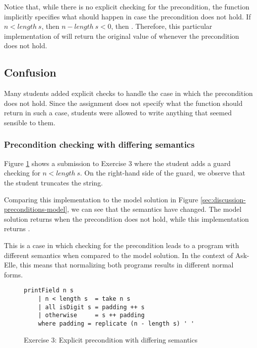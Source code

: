 Notice that, while there is no explicit checking for the precondition, the function implicitly specifies what should happen in case the precondition does not hold. If $n < length\ s$, then $n - length\ s < 0$, then . Therefore, this particular implementation of  will return the original value of  whenever the precondition does not hold.

\subsection{Confusion}

Many students added explicit checks to handle the case in which the precondition does not hold. Since the assignment does not specify what the function should return in such a case, students were allowed to write anything that seemed sensible to them.

\subsubsection{Precondition checking with differing semantics}

Figure \ref{fig:analysis-precondition-example} shows a submission to Exercise 3 where the student adds a guard checking for $n < length\ s$. On the right-hand side of the guard, we observe that the student truncates the string.

Comparing this implementation to the model solution in Figure \ref{sec:discussion-preconditions-model}, we can see that the semantics have changed. The model solution returns  when the precondition does not hold, while this implementation returns .

This is a case in which checking for the precondition leads to a program with different semantics when compared to the model solution. In the context of Ask-Elle, this means that normalizing both programs  results in different normal forms.

\begin{figure}
\centering
\begin{verbatim}
printField n s
    | n < length s  = take n s
    | all isDigit s = padding ++ s
    | otherwise     = s ++ padding
    where padding = replicate (n - length s) ' '
\end{verbatim}
\caption{Exercise 3: Explicit precondition with differing semantics}
\label{fig:analysis-precondition-example}
\end{figure}

